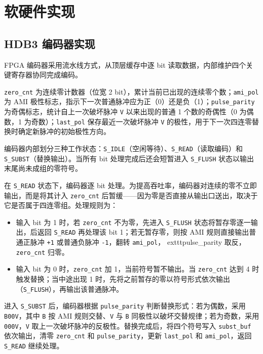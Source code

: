 \documentclass[UTF8,a4paper,12pt]{ctexart}
\begin{document}
\section{软硬件实现}

\subsection{HDB3 编码器实现}

FPGA 编码器采用流水线方式，从顶层缓存中逐 bit 读取数据，内部维护四个关键寄存器协同完成编码。

\texttt{zero\_cnt} 为连续零计数器（位宽 2 bit），累计当前已出现的连续零个数；\texttt{ami\_pol} 为 AMI 极性标志，指示下一次普通脉冲应为正（0）还是负（1）；\texttt{pulse\_parity} 为奇偶标志，统计自上一次破坏脉冲 \texttt{V} 以来出现的普通 1 个数的奇偶性（0 为偶数，1 为奇数）；\texttt{last\_pol} 保存最近一次破坏脉冲 \texttt{V} 的极性，用于下一次四连零替换时确定新脉冲的初始极性方向。

编码器内部划分三种工作状态：\texttt{S\_IDLE}（空闲等待）、\texttt{S\_READ}（读取编码）和 \texttt{S\_SUBST}（替换输出）。当所有 bit 处理完成后还会短暂进入 \texttt{S\_FLUSH} 状态以输出末尾尚未成组的零符号。

在 \texttt{S\_READ} 状态下，编码器逐 bit 处理。为提高吞吐率，编码器对连续的零不立即输出，而是将其计入 \texttt{zero\_cnt} 后暂缓——因为零是否直接从输出口送出，取决于它是否属于四连零组。处理规则为：

\begin{itemize}
  \item 输入 bit 为 1 时，若 \texttt{zero\_cnt} 不为零，先进入 \texttt{S\_FLUSH} 状态将暂存零逐一输出，后返回 \texttt{S\_READ} 再处理该 bit 1；若无暂存零，则按 AMI 规则直接输出普通正脉冲 \texttt{+1} 或普通负脉冲 \texttt{-1}，翻转 \texttt{ami\_pol}，	exttt{pulse\_parity} 取反，\texttt{zero\_cnt} 归零。
  \item 输入 bit 为 0 时，\texttt{zero\_cnt} 加 1，当前符号暂不输出。当 \texttt{zero\_cnt} 达到 4 时触发替换；当中途出现 1 时，先将之前暂存的零以符号形式依次输出（\texttt{S\_FLUSH}），再输出该普通脉冲。
\end{itemize}

进入 \texttt{S\_SUBST} 后，编码器根据 \texttt{pulse\_parity} 判断替换形式：若为偶数，采用 \texttt{B00V}，其中 \texttt{B} 按 AMI 规则交替、\texttt{V} 与 \texttt{B} 同极性以破坏交替规律；若为奇数，采用 \texttt{000V}，\texttt{V} 取上一次破坏脉冲的反极性。替换完成后，将四个符号写入 \texttt{subst\_buf} 依次输出，清零 \texttt{zero\_cnt} 和 \texttt{pulse\_parity}，更新 \texttt{last\_pol} 和 \texttt{ami\_pol}，返回 \texttt{S\_READ} 继续处理。
\end{document}
